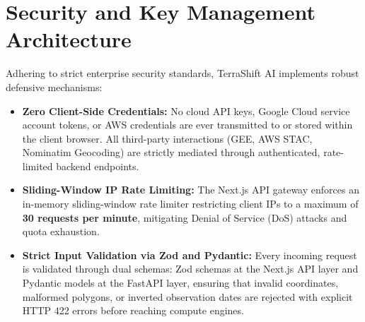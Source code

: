 \section{Security and Key Management Architecture}
\label{sec:arch_security}
Adhering to strict enterprise security standards, TerraShift AI implements robust defensive mechanisms:
\begin{itemize}
    \item \textbf{Zero Client-Side Credentials:} No cloud API keys, Google Cloud service account tokens, or AWS credentials are ever transmitted to or stored within the client browser. All third-party interactions (GEE, AWS STAC, Nominatim Geocoding) are strictly mediated through authenticated, rate-limited backend endpoints.
    \item \textbf{Sliding-Window IP Rate Limiting:} The Next.js API gateway enforces an in-memory sliding-window rate limiter restricting client IPs to a maximum of \textbf{30 requests per minute}, mitigating Denial of Service (DoS) attacks and quota exhaustion.
    \item \textbf{Strict Input Validation via Zod and Pydantic:} Every incoming request is validated through dual schemas: Zod schemas at the Next.js API layer and Pydantic models at the FastAPI layer, ensuring that invalid coordinates, malformed polygons, or inverted observation dates are rejected with explicit HTTP 422 errors before reaching compute engines.
\end{itemize}
\newpage

